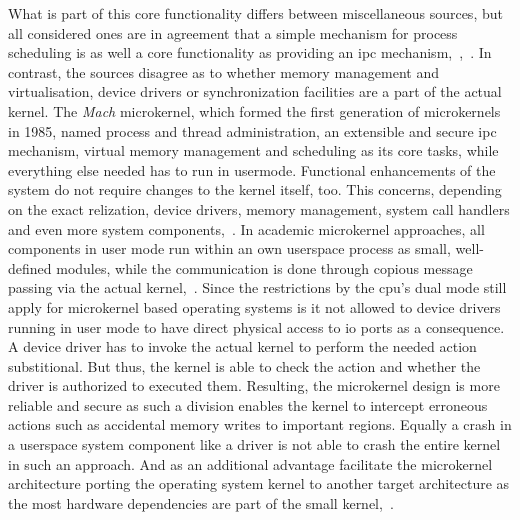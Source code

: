 What is part of this core functionality differs between miscellaneous sources, but all considered ones are in agreement that a simple mechanism for process scheduling is as well a core functionality as providing an \ac{ipc} mechanism\cite{lfd430},~\cite{silberschatz2009operating},~\cite{glatz2015betriebssysteme}.  
In contrast, the sources disagree as to whether memory management and virtualisation, device drivers or synchronization facilities are a part of the actual kernel.
The \textit{Mach} microkernel, which formed the first generation of microkernels in 1985, named process and thread administration, an extensible and secure \ac{ipc} mechanism, virtual memory management and scheduling as its core tasks, while everything else needed has to run in usermode\cite{rashidMach}.
Functional enhancements of the system do not require changes to the kernel itself, too.
This concerns, depending on the exact relization, device drivers, memory management, system call handlers and even more system components\cite{lfd430},~\cite{silberschatz2009operating}.
In academic microkernel approaches, all components in user mode run within an own userspace process as small, well-defined modules, while the communication is done through copious message passing via the actual kernel\cite{tanenbaum-modern-operating-systems},~\cite{lfd430}.
Since the restrictions by the \ac{cpu}'s dual mode still apply for microkernel based operating systems is it not allowed to device drivers running in user mode to have direct physical access to \ac{io} ports as a consequence.
A device driver has to invoke the actual kernel to perform the needed action substitional.
But thus, the kernel is able to check the action and whether the driver is authorized to executed them.
Resulting, the microkernel design is more reliable and secure as such a division enables the kernel to intercept erroneous actions such as accidental memory writes to important regions\cite{tanenbaum-modern-operating-systems}.
Equally a crash in a userspace system component like a driver is not able to crash the entire kernel in such an approach. 
And as an additional advantage facilitate the microkernel architecture porting the operating system kernel to another target architecture as the most hardware dependencies are part of the small kernel\cite{silberschatz2009operating},~\cite{lfd430}.

